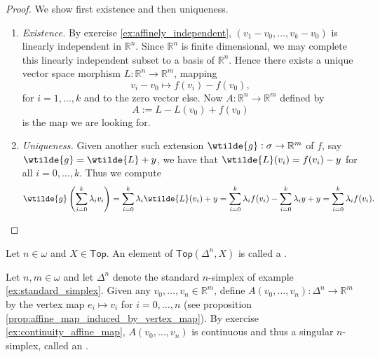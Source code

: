 \begin{proof}
	We show first existence and then uniqueness.
	\begin{enumerate}[label = \textit{Step \arabic*:},wide=0pt]
		\item \textit{Existence.} By exercise \ref{ex:affinely_independent}, $(v_1 - v_0,\dots, v_k - v_0)$ is linearly independent in $\mathbb{R}^n$. Since $\mathbb{R}^n$ is finite dimensional, we may complete this linearly independent subset to a basis of $\mathbb{R}^n$. Hence there exists a unique vector space morphism $L : \mathbb{R}^n \to \mathbb{R}^m$, mapping 
			\begin{equation*}
				v_i - v_0 \mapsto f(v_i) - f(v_0),
			\end{equation*}
			\noindent for $i = 1,\dots,k$ and to the zero vector else. Now $A : \mathbb{R}^n \to \mathbb{R}^m$ defined by
			\begin{equation*}
				 A := L - L(v_0) + f(v_0)
			\end{equation*}
			\noindent is the map we are looking for.
		\item \textit{Uniqueness.} Given another such extension $\wtilde{g} : \sigma \to \mathbb{R}^m$ of $f$, say $\wtilde{g} = \wtilde{L} + y$, we have that $\wtilde{L}(v_i) = f(v_i) - y$ for all $i = 0,\dots,k$. Thus we compute 
			\begin{equation*}
				\wtilde{g}\del[4]{\sum_{i = 0}^k \lambda_i v_i} = \sum_{i = 0}^k \lambda_i \wtilde{L}(v_i) + y = \sum_{i = 0}^k \lambda_i f(v_i) - \sum_{i = 0}^k \lambda_i y + y = \sum_{i = 0}^k \lambda_i f(v_i).
			\end{equation*}
	\end{enumerate}
\end{proof}

\begin{definition}
	Let $n \in \omega$ and $X \in \mathsf{Top}$. An element of $\mathsf{Top}(\Delta^n,X)$ is called a .
\end{definition}

\begin{example}
	Let $n,m \in \omega$ and let $\Delta^n$ denote the standard $n$-simplex of example \ref{ex:standard_simplex}. Given any $v_0,\dots,v_n \in \mathbb{R}^m$, define $A(v_0,\dots,v_n): \Delta^n \to \mathbb{R}^m$ by the vertex map $e_i \mapsto v_i$ for $i = 0,\dots,n$ (see proposition \ref{prop:affine_map_induced_by_vertex_map}). By exercise \ref{ex:continuity_affine_map}, $A(v_0,\dots,v_n)$ is continuous and thus a singular $n$-simplex, called an . 
\end{example}

